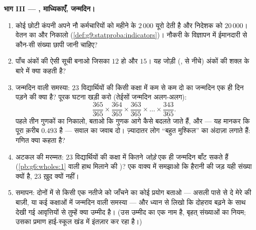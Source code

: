 \begin{problem}
\medskip
\noindent\textbf{भाग III --- , माध्यिकाएँ, जन्मदिन।}
\begin{enumerate}[resume]
  \item कोई छोटी कंपनी अपने नौ कर्मचारियों को महीने के $2\,000$
        यूरो देती है और निदेशक को $20\,000$। वेतन का  और
         निकालो (\cref{def:g9:statproba:indicators})।
        नौकरी के विज्ञापन में ईमानदारी से कौन-सी संख्या छापी जानी
        चाहिए?
  \item पाँच अंकों की ऐसी सूची बनाओ जिसका  $12$ हो और
         $15$। यह जोड़ी (,  से नीचे) अंकों की
        शक्ल के बारे में क्या कहती है?
  \item जन्मदिन वाली समस्या: $23$ विद्यार्थियों की किसी कक्षा में
        कम से कम दो का जन्मदिन एक ही दिन पड़ने की  क्या
        है? पूरक घटना खड़ी करो (तेईसों जन्मदिन अलग-अलग):
        \[
        \frac{365}{365} \times \frac{364}{365} \times
        \frac{363}{365} \times \dots \times \frac{343}{365} .
        \]
        पहले तीन गुणकों का  निकालो, बताओ कि गुणक आगे कैसे
        बदलते जाते हैं, और --- यह मानकर कि पूरा  क़रीब
        $0.493$ है --- सवाल का जवाब दो। ज़्यादातर लोग ``बहुत
        मुश्किल'' का अंदाज़ा लगाते हैं: गणित क्या कहता है?
  \item अटकल की मरम्मत: $23$ विद्यार्थियों की कक्षा में कितने
        \emph{जोड़े} एक ही जन्मदिन बाँट सकते हैं
        (\cref{pb:g6:wholes:1} वाली हाथ मिलाने की )? एक वाक्य
        में समझाओ कि हैरानी की जड़ यही संख्या क्यों है, $23$ ख़ुद
        क्यों नहीं।
  \item समापन: दोनों में से किसी एक नतीजे को जाँचने का कोई प्रयोग
        बताओ --- असली पासे से दे मेरे की बाज़ी, या कई कक्षाओं में
        जन्मदिन वाली समस्या --- और ध्यान से लिखो कि दोहराव बढ़ने
        के साथ देखी गई आवृत्तियों से तुम्हें क्या उम्मीद है। (उस
        उम्मीद का एक नाम है, बृहत् संख्याओं का नियम; उसका प्रमाण
        हाई-स्कूल खंड में इंतज़ार कर रहा है।)

\end{enumerate}
\end{problem}
